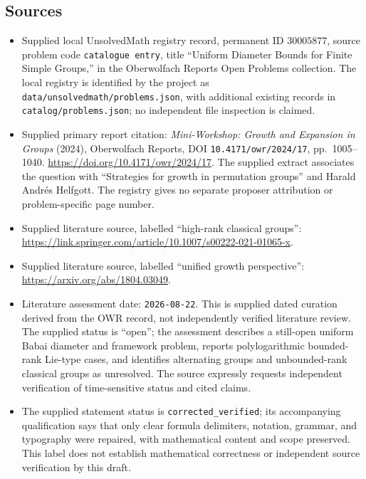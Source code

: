 \documentclass[11pt]{article}
\begin{document}
\subsection{Sources}
\begin{itemize}
\item Supplied local UnsolvedMath registry record, permanent ID \(30005877\), source problem code \texttt{catalogue entry}, title ``Uniform Diameter Bounds for Finite Simple Groups,'' in the Oberwolfach Reports Open Problems collection. The local registry is identified by the project as \texttt{data/unsolvedmath/problems.json}, with additional existing records in \texttt{catalog/problems.json}; no independent file inspection is claimed.
\item Supplied primary report citation: \emph{Mini-Workshop: Growth and Expansion in Groups} (2024), Oberwolfach Reports, DOI \texttt{10.4171/owr/2024/17}, pp.~1005--1040. \url{https://doi.org/10.4171/owr/2024/17}. The supplied extract associates the question with ``Strategies for growth in permutation groups'' and Harald Andr\'es Helfgott. The registry gives no separate proposer attribution or problem-specific page number.
\item Supplied literature source, labelled ``high-rank classical groups'': \url{https://link.springer.com/article/10.1007/s00222-021-01065-x}.
\item Supplied literature source, labelled ``unified growth perspective'': \url{https://arxiv.org/abs/1804.03049}.
\item Literature assessment date: \texttt{2026-08-22}. This is supplied dated curation derived from the OWR record, not independently verified literature review. The supplied status is ``open''; the assessment describes a still-open uniform Babai diameter and framework problem, reports polylogarithmic bounded-rank Lie-type cases, and identifies alternating groups and unbounded-rank classical groups as unresolved. The source expressly requests independent verification of time-sensitive status and cited claims.
\item The supplied statement status is \texttt{corrected\_verified}; its accompanying qualification says that only clear formula delimiters, notation, grammar, and typography were repaired, with mathematical content and scope preserved. This label does not establish mathematical correctness or independent source verification by this draft.
\end{itemize}
\end{document}
